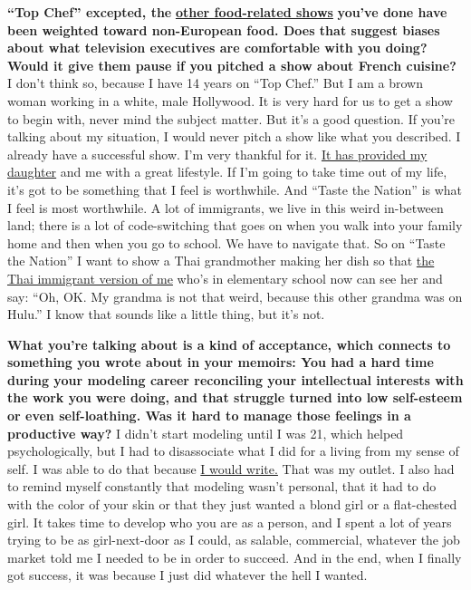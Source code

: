 \textbf{``Top Chef'' excepted, the}
\textbf{\href{http://nytimes.com\#tooltip-8}{other food-related shows}}
\textbf{you've done have been weighted toward non-European food. Does
that suggest biases about what television executives are comfortable
with you doing? Would it give them pause if you pitched a show about
French cuisine?} I don't think so, because I have 14 years on ``Top
Chef.'' But I am a brown woman working in a white, male Hollywood. It is
very hard for us to get a show to begin with, never mind the subject
matter. But it's a good question. If you're talking about my situation,
I would never pitch a show like what you described. I already have a
successful show. I'm very thankful for it.
\href{http://nytimes.com\#tooltip-9}{It has provided my daughter} and me
with a great lifestyle. If I'm going to take time out of my life, it's
got to be something that I feel is worthwhile. And ``Taste the Nation''
is what I feel is most worthwhile. A lot of immigrants, we live in this
weird in-between land; there is a lot of code-switching that goes on
when you walk into your family home and then when you go to school. We
have to navigate that. So on ``Taste the Nation'' I want to show a Thai
grandmother making her dish so that
\href{http://nytimes.com\#tooltip-10}{the Thai immigrant version of me}
who's in elementary school now can see her and say: ``Oh, OK. My grandma
is not that weird, because this other grandma was on Hulu.'' I know that
sounds like a little thing, but it's not.

\textbf{What you're talking about is a kind of acceptance, which
connects to something you wrote about in your memoirs: You had a hard
time during your modeling career reconciling your intellectual interests
with the work you were doing, and that struggle turned into low
self-esteem or even self-loathing. Was it hard to manage those feelings
in a productive way?} I didn't start modeling until I was 21, which
helped psychologically, but I had to disassociate what I did for a
living from my sense of self. I was able to do that because
\href{http://nytimes.com\#tooltip-11}{I would write.} That was my
outlet. I also had to remind myself constantly that modeling wasn't
personal, that it had to do with the color of your skin or that they
just wanted a blond girl or a flat-chested girl. It takes time to
develop who you are as a person, and I spent a lot of years trying to be
as girl-next-door as I could, as salable, commercial, whatever the job
market told me I needed to be in order to succeed. And in the end, when
I finally got success, it was because I just did whatever the hell I
wanted.

